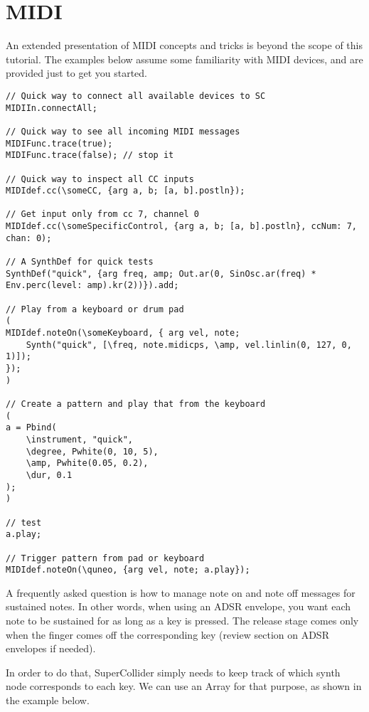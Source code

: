 \section{MIDI}

An extended presentation of MIDI concepts and tricks is beyond the scope of this tutorial. The examples below assume some familiarity with MIDI devices, and are provided just to get you started.

\begin{lstlisting}[style=SuperCollider-IDE, basicstyle=\scttfamily\footnotesize]
// Quick way to connect all available devices to SC
MIDIIn.connectAll;

// Quick way to see all incoming MIDI messages
MIDIFunc.trace(true);
MIDIFunc.trace(false); // stop it

// Quick way to inspect all CC inputs
MIDIdef.cc(\someCC, {arg a, b; [a, b].postln});

// Get input only from cc 7, channel 0
MIDIdef.cc(\someSpecificControl, {arg a, b; [a, b].postln}, ccNum: 7, chan: 0);

// A SynthDef for quick tests
SynthDef("quick", {arg freq, amp; Out.ar(0, SinOsc.ar(freq) * Env.perc(level: amp).kr(2))}).add;

// Play from a keyboard or drum pad
(
MIDIdef.noteOn(\someKeyboard, { arg vel, note;
	Synth("quick", [\freq, note.midicps, \amp, vel.linlin(0, 127, 0, 1)]);
});
)

// Create a pattern and play that from the keyboard
(
a = Pbind(
	\instrument, "quick",
	\degree, Pwhite(0, 10, 5),
	\amp, Pwhite(0.05, 0.2),
	\dur, 0.1
);
)

// test
a.play;

// Trigger pattern from pad or keyboard
MIDIdef.noteOn(\quneo, {arg vel, note; a.play});
\end{lstlisting}

A frequently asked question is how to manage note on and note off messages for sustained notes. In other words, when using an ADSR envelope, you want each note to be sustained for as long as a key is pressed. The release stage comes only when the finger comes off the corresponding key (review section on ADSR envelopes if needed).

In order to do that, SuperCollider simply needs to keep track of which synth node corresponds to each key. We can use an Array for that purpose, as shown in the example below.

